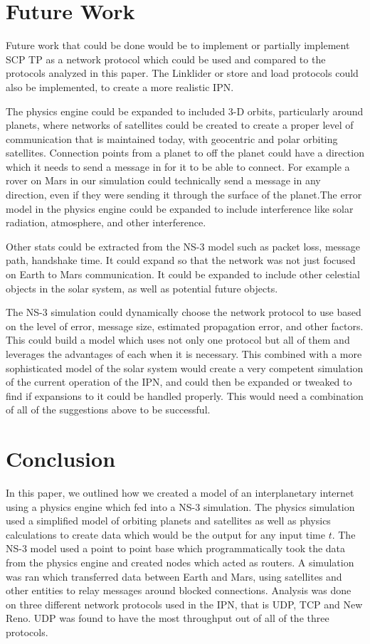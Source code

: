 \documentclass[a4paper,12pt]{article}
\begin{document}
\section{Future Work}

Future work that could be done would be to implement or partially implement SCP
TP as a network protocol which could be used and compared to the protocols
analyzed in this paper. The Linklider or store and load protocols could also be
implemented, to create a more realistic IPN.

The physics engine could be expanded to included 3-D orbits, particularly around
planets, where networks of satellites could be created to create a proper level
of communication that is maintained today, with geocentric and polar orbiting
satellites. Connection points from a planet to off the planet could have a
direction which it needs to send a message in for it to be able to connect. For
example a rover on Mars in our simulation could technically send a message in
any direction, even if they were sending it through the surface of the
planet.The error model in the physics engine could be expanded to include
interference like solar radiation, atmosphere, and other interference.

Other stats could be extracted from the NS-3 model such as packet loss, message
path, handshake time. It could expand so that the network was not just focused
on Earth to Mars communication. It could be expanded to include other celestial
objects in the solar system, as well as potential future objects.

The NS-3 simulation could dynamically choose the network protocol to use based
on the level of error, message size, estimated propagation error, and other
factors. This could build a model which uses not only one protocol but all of
them and leverages the advantages of each when it is necessary. This combined
with a more sophisticated model of the solar system would create a very
competent simulation of the current operation of the IPN, and could then be
expanded or tweaked to find if expansions to it could be handled properly. This
would need a combination of all of the suggestions above to be successful.

\section{Conclusion}

In this paper, we outlined how we created a model of an interplanetary internet
using a physics engine which fed into a NS-3 simulation. The physics simulation
used a simplified model of orbiting planets and satellites as well as physics
calculations to create data which would be the output for any input time $t$.
The NS-3 model used a point to point base which programmatically took the data
from the physics engine and created nodes which acted as routers. A simulation
was ran which transferred data between Earth and Mars, using satellites and
other entities to relay messages around blocked connections. Analysis was done
on three different network protocols used in the IPN, that is UDP, TCP and New
Reno. UDP was found to have the most throughput out of all of the three
protocols.

\printbibliography{}
\end{document}
